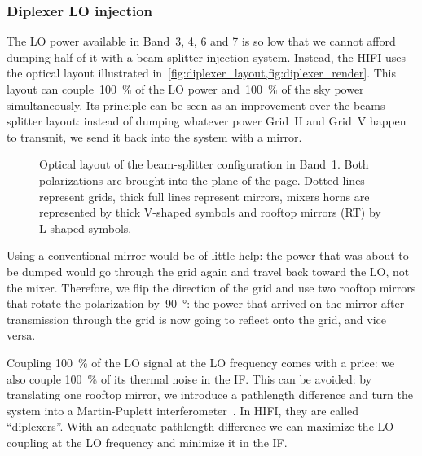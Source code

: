 \subsubsection{Diplexer LO injection}
\label{sec:diplexer_lo_injection}
The LO power available in Band~3, 4, 6 and 7 is so low that we cannot afford dumping half of it with a beam-splitter injection system.
Instead, the HIFI uses the optical layout illustrated in~\cref{fig:diplexer_layout,fig:diplexer_render}.
This layout can couple~\SI{100}{\percent} of the LO power and~\SI{100}{\percent} of the sky power simultaneously.
Its principle can be seen as an improvement over the beams-splitter layout:
instead of dumping whatever power Grid~H and Grid~V happen to transmit, we send it back into the system with a mirror.

\begin{figure}
    \centering
    \footnotesize
    
    \caption{Optical layout of the beam-splitter configuration in Band~1.
    Both polarizations are brought into the plane of the page.
    Dotted lines represent grids, thick full lines represent mirrors, mixers horns are represented by thick V-shaped symbols and rooftop mirrors (RT) by L-shaped symbols.
    }
    \label{fig:diplexer_layout}
\end{figure}

Using a conventional mirror would be of little help: the power that was about to be dumped would go through the grid again and travel back toward the LO, not the mixer.
Therefore, we flip the direction of the grid and use two rooftop mirrors that rotate the polarization by~\SI{90}{\degree}: the power that arrived on the mirror after transmission through the grid is now going to reflect onto the grid, and vice versa.

Coupling \SI{100}{\percent} of the LO signal at the LO frequency comes with a price: we also couple \SI{100}{\percent} of its thermal noise in the IF.
This can be avoided: by translating one rooftop mirror, we introduce a pathlength difference and turn the system into a Martin-Puplett interferometer~\parencite{martin1982polarizing}.
In HIFI, they are called ``diplexers''.
With an adequate pathlength difference we can maximize the LO coupling at the LO frequency and minimize it in the IF.

